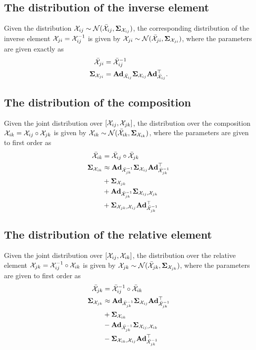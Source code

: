 \subsection{The distribution of the inverse element}
Given the distribution $\cX_{ij} \sim \cN(\bar{\cX}_{ij}, \matSigma_{\cX_{ij}})$, the corresponding distribution of the inverse element $\cX_{ji} = \cX_{ij}^{-1}$ is given by $\cX_{ji} \sim \cN(\bar{\cX}_{ji}, \matSigma_{\cX_{ji}})$, where the parameters are given exactly as
\begin{align}
    \bar{\cX}_{ji} & = \bar{\cX}_{ij}^{-1}\\
    \matSigma_{\cX_{ji}} &= \mAd_{\bar{\cX}_{ij}} \matSigma_{\cX_{ij}} \mAd_{\bar{\cX}_{ij}}\trans.
\end{align}

\subsection{The distribution of the composition}
Given the joint distribution over $[\cX_{ij}, \cX_{jk}]$, the distribution over the composition $\cX_{ik} = \cX_{ij} \circ \cX_{jk}$ is given by $\cX_{ik} \sim \cN(\bar{\cX}_{ik}, \matSigma_{\cX_{ik}})$, where the parameters are given to first order as
\begin{align}
    \bar{\cX}_{ik} &= \bar{\cX}_{ij} \circ \bar{\cX}_{jk}\\
    \matSigma_{\cX_{ik}} &\approx 
    \mAd_{\bar{\cX}_{jk}^{-1}} \matSigma_{\cX_{ij}} \mAd_{\bar{\cX}_{jk}^{-1}}\trans \nonumber\\
    &+ \matSigma_{\cX_{jk}} \nonumber\\
    &+ \mAd_{\bar{\cX}_{jk}^{-1}} \matSigma_{\cX_{ij}, \cX_{jk}}\\
    &+ \matSigma_{\cX_{jk}, \cX_{ij}} \mAd_{\bar{\cX}_{jk}^{-1}}\trans \nonumber
\end{align}

\subsection{The distribution of the relative element}
Given the joint distribution over $[\cX_{ij}, \cX_{ik}]$, the distribution over the relative element $\cX_{jk} = \cX_{ij}^{-1} \circ \cX_{ik}$ is given by $\cX_{jk} \sim \cN(\bar{\cX}_{jk}, \matSigma_{\cX_{jk}})$, where the parameters are given to first order as
\begin{align}
  \bar{\cX}_{jk} &= \bar{\cX}_{ij}^{-1} \circ \bar{\cX}_{ik}\\
  \matSigma_{\cX_{jk}} &\approx 
  \mAd_{\bar{\cX}_{jk}^{-1}} \matSigma_{\cX_{ij}} \mAd_{\bar{\cX}_{jk}^{-1}}\trans \nonumber\\
    &+ \matSigma_{\cX_{ik}} \nonumber\\
    &- \mAd_{\bar{\cX}_{jk}^{-1}} \matSigma_{\cX_{ij}, \cX_{ik}}\\
    &- \matSigma_{\cX_{ik}, \cX_{ij}} \mAd_{\bar{\cX}_{jk}^{-1}}\trans \nonumber
\end{align}
